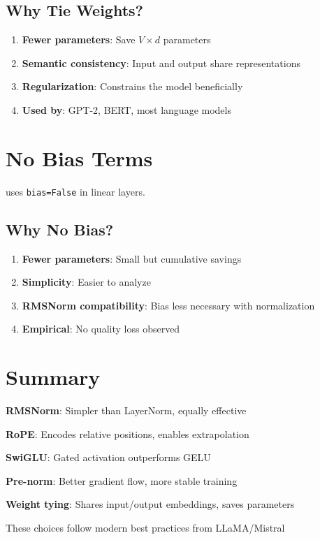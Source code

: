\subsection{Why Tie Weights?}

\begin{enumerate}
    \item \textbf{Fewer parameters}: Save $V \times d$ parameters
    \item \textbf{Semantic consistency}: Input and output share representations
    \item \textbf{Regularization}: Constrains the model beneficially
    \item \textbf{Used by}: GPT-2, BERT, most language models
\end{enumerate}

\section{No Bias Terms}

\TryLM uses \texttt{bias=False} in linear layers.

\subsection{Why No Bias?}

\begin{enumerate}
    \item \textbf{Fewer parameters}: Small but cumulative savings
    \item \textbf{Simplicity}: Easier to analyze
    \item \textbf{RMSNorm compatibility}: Bias less necessary with normalization
    \item \textbf{Empirical}: No quality loss observed
\end{enumerate}

\section{Summary}

\begin{summary}
    \item \textbf{RMSNorm}: Simpler than LayerNorm, equally effective
    \item \textbf{RoPE}: Encodes relative positions, enables extrapolation
    \item \textbf{SwiGLU}: Gated activation outperforms GELU
    \item \textbf{Pre-norm}: Better gradient flow, more stable training
    \item \textbf{Weight tying}: Shares input/output embeddings, saves parameters
    \item These choices follow modern best practices from LLaMA/Mistral
\end{summary}
